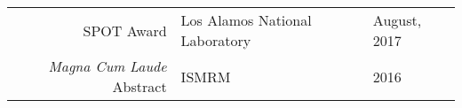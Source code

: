 
\begin{minipage}{\textwidth}
\begin{tabular}{rll}
SPOT Award & Los Alamos National Laboratory & August, 2017 \\ 
\textit{Magna Cum Laude} Abstract & ISMRM & 2016 \\
\end{tabular}
\end{minipage}
